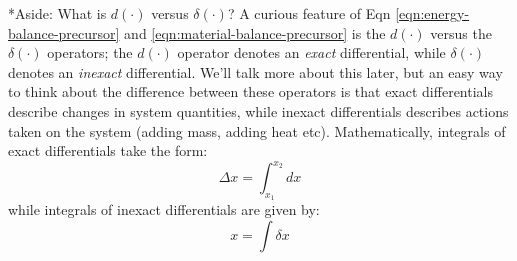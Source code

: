 \documentclass[11pt]{article}
\makeatletter
\theoremstyle{definition}
\renewcommand\paragraph{\@startsection
	{paragraph}{2}{0mm}
	{-0.05in}
	{-0.5\baselineskip}
	{\normalfont\normalsize\itshape}}
\makeatother
\begin{document}
\paragraph*{Aside: What is $d\left(\cdot\right)$ versus $\delta\left(\cdot\right)$?}
A curious feature of Eqn \eqref{eqn:energy-balance-precursor} and \eqref{eqn:material-balance-precursor} is the $d\left(\cdot\right)$ versus the $\delta\left(\cdot\right)$ operators;
the $d\left(\cdot\right)$ operator denotes an \textit{exact} differential, while $\delta\left(\cdot\right)$ denotes an \textit{inexact} differential.
We'll talk more about this later, but an easy way to think about the difference between these operators is that exact differentials describe changes in system quantities,
while inexact differentials describes actions taken on the system (adding mass, adding heat etc).
Mathematically, integrals of exact differentials take the form:
\begin{equation}
\Delta x = \int_{x_{1}}^{x_{2}}dx
\end{equation}while integrals of inexact differentials are given by:
\begin{equation}
x = \int \delta x
\end{equation}
\end{document}
